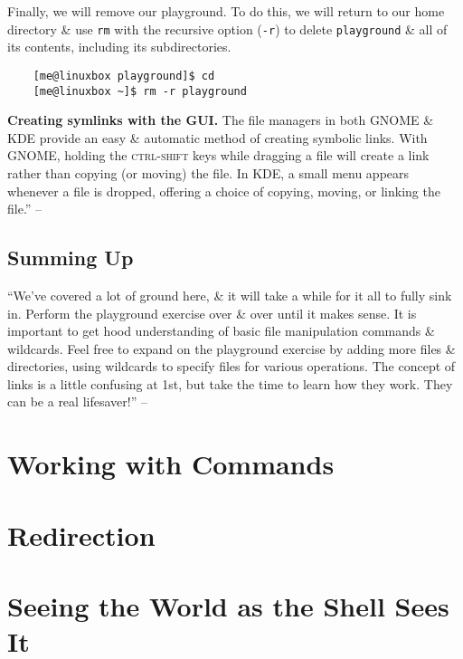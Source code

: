 \documentclass[oneside]{book}
\numberwithin{equation}{section}
\begin{document}
Finally, we will remove our playground. To do this, we will return to our home directory \& use \texttt{rm} with the recursive option (\texttt{-r}) to delete \texttt{playground} \& all of its contents, including its subdirectories.
\begin{verbatim}
	[me@linuxbox playground]$ cd
	[me@linuxbox ~]$ rm -r playground
\end{verbatim}
\textbf{Creating symlinks with the GUI.} The file managers in both GNOME \& KDE provide an easy \& automatic method of creating symbolic links. With GNOME, holding the \textsc{ctrl-shift} keys while dragging a file will create a link rather than copying (or moving) the file. In KDE, a small menu appears whenever a file is dropped, offering a choice of copying, moving, or linking the file.'' -- \cite[pp. 80--82]{Shotts2019}

\subsection{Summing Up}
``We've covered a lot of ground here, \& it will take a while for it all to fully sink in. Perform the playground exercise over \& over until it makes sense. It is important to get hood understanding of basic file manipulation commands \& wildcards. Feel free to expand on the playground exercise by adding more files \& directories, using wildcards to specify files for various operations. The concept of links is a little confusing at 1st, but take the time to learn how they work. They can be a real lifesaver!'' -- \cite[p. 82]{Shotts2019}


\section{Working with Commands}


\section{Redirection}


\section{Seeing the World as the Shell Sees It}
\end{document}
